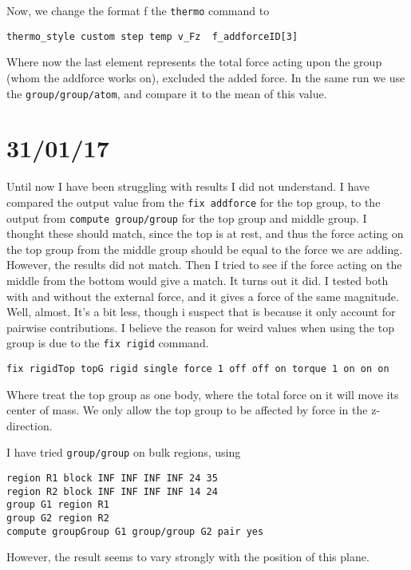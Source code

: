 \documentclass[twoside,english]{uiofysmaster}
\begin{document}
Now, we change the format f the \texttt{thermo} command to
\begin{lstlisting}[language=lammpsInput]
thermo_style custom step temp v_Fz  f_addforceID[3]
\end{lstlisting}
Where now the last element represents the total force acting upon the group (whom the addforce works on), excluded the added force. In the same run we use the \texttt{group/group/atom}, and compare it to the mean of this value. 






\section*{31/01/17}
Until now I have been struggling with results I did not understand. I have compared the output value from the \texttt{fix addforce} for the top group, to the output from \texttt{compute group/group} for the top group and middle group. I thought these should match, since the top is at rest, and thus the force acting on the top group from the middle group should be equal to the force we are adding. However, the results did not match. 
Then I tried to see if the force acting on the middle from the bottom would give a match. It turns out it did. I tested both with and without the external force, and it gives a force of the same magnitude. Well, almost. It's a bit less,  though i suspect that is because it only account for pairwise contributions. I believe the reason for weird values when using the top group is due to the \texttt{fix rigid} command. 
\begin{lstlisting}[language=lammpsInput]
fix rigidTop topG rigid single force 1 off off on torque 1 on on on
\end{lstlisting}
Where treat the top group as one body, where the total force on it will move its center of mass. We only allow the top group to be affected by force in the z-direction.


I have tried \texttt{group/group} on bulk regions, using 
\begin{lstlisting}[language=lammpsInput]
region R1 block INF INF INF INF 24 35
region R2 block INF INF INF INF 14 24
group G1 region R1
group G2 region R2
compute groupGroup G1 group/group G2 pair yes
\end{lstlisting}
However, the result seems to vary strongly with the position of this plane. 
\end{document}
